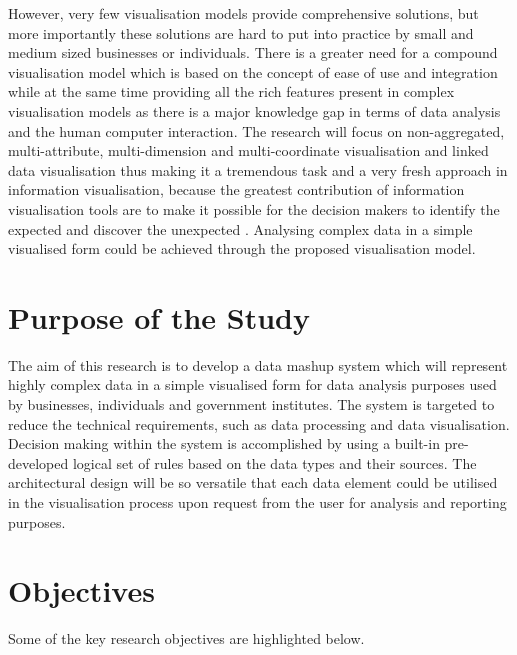 However, very few visualisation models provide comprehensive solutions, but more importantly these solutions are hard to put into practice by small and medium sized businesses or individuals. There is a greater need for a compound visualisation model which is based on the concept of ease of use and integration while at the same time providing all the rich features present in complex visualisation models as there is a major knowledge gap in terms of data analysis and the human computer interaction. The research will focus on non-aggregated,  multi-attribute, multi-dimension and multi-coordinate visualisation and linked data visualisation thus making it a tremendous task and a very fresh approach in information visualisation, because the greatest contribution of information visualisation tools are to make it possible for the decision makers to identify the expected and discover the unexpected \cite{12}. Analysing complex data in a simple visualised form could be achieved through the proposed visualisation model.

\section{Purpose of the Study}

The aim of this research is to develop a data mashup system which will represent highly complex data in a simple visualised form for data analysis purposes used by businesses, individuals and government institutes. The system is targeted to reduce the technical requirements, such as data processing and data visualisation. Decision making within the system is accomplished by using a built-in pre-developed logical set of rules based on the data types and their sources. The architectural design will be so versatile that each data element could be utilised in the visualisation process upon request from the user for analysis and reporting purposes. 

\section{Objectives }

Some of the key research objectives are highlighted below.

